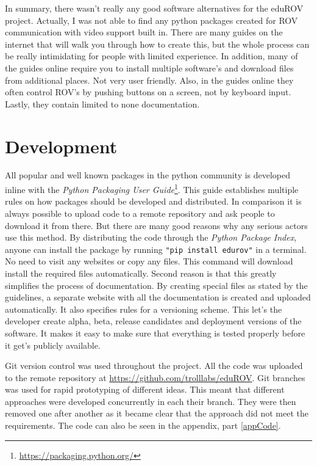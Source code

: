 In summary, there wasn't really any good software alternatives for the eduROV project. Actually, I was not able to find any python packages created for ROV communication with video support built in. There are many guides on the internet that will walk you through how to create this, but the whole process can be really intimidating for people with limited experience. In addition, many of the guides online require you to install multiple software's and download files from additional places. Not very user friendly. Also, in the guides online they often control ROV's by pushing buttons on a screen, not by keyboard input. Lastly, they contain limited to none documentation.

\section{Development}

All popular and well known packages in the python community is developed inline with the \emph{Python Packaging User Guide}\footnote{\url{https://packaging.python.org/}}. This guide establishes multiple rules on how packages should be developed and distributed. In comparison it is always possible to upload code to a remote repository and ask people to download it from there. But there are many good reasons why any serious actors use this method. By distributing the code through the \emph{Python Package Index}, anyone can install the package by running \texttt{"pip install edurov"} in a terminal. No need to visit any websites or copy any files. This command will download install the required files automatically. Second reason is that this greatly simplifies the process of documentation. By creating special files as stated by the guidelines, a separate website with all the documentation is created and uploaded automatically. It also specifies rules for a versioning scheme. This let's the developer create alpha, beta, release candidates and deployment versions of the software. It makes it easy to make sure that everything is tested properly before it get's publicly available.

Git version control was used throughout the project. All the code was uploaded to the remote repository at \url{https://github.com/trolllabs/eduROV}. Git branches was used for rapid prototyping of different ideas. This meant that different approaches were developed concurrently in each their branch. They were then removed one after another as it became clear that the approach did not meet the requirements. The code can also be seen in the appendix, part \ref{appCode}.


